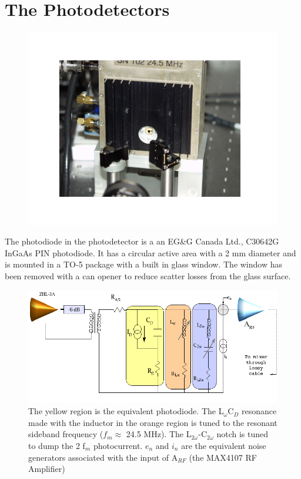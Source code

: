 %
\chapter{The Photodetectors}
\label{app:RFPD}

\begin{figure}[!h]
\centerline{\includegraphics[angle=0,width=6.5in]{Figures/AppH/ASPD.pdf}}
\end{figure}

The photodiode in the photodetector is a an EG\&G Canada Ltd., C30642G InGaAs PIN
photodiode. It has a circular active area with a 2 mm diameter and is mounted in a 
TO-5 package with a built in glass window. The window has been removed with a 
can opener to reduce scatter losses from the glass surface.

\begin{figure}[!h]
\centerline{
\includegraphics[angle=0,width=6.5in]{Figures/AppH/PD-Circuit.png}}
\caption[Simplified Photodetector Schematic]{The yellow region is
         the equivalent photodiode. The L$_{\omega}$C$_D$ resonance made with
         the inductor in the orange region is tuned to the
         resonant sideband frequency ($f_m \approx$ 24.5 MHz). 
         The L$_{2 \omega}$-C$_{2 \omega}$
         notch is tuned to dump the 2 f$_m$ photocurrent. $e_n$ and $i_n$
         are the equivalent noise generators associated with the input of
         A$_{RF}$ (the MAX4107 RF Amplifier)}
\label{fig:RFPD}
\end{figure}

